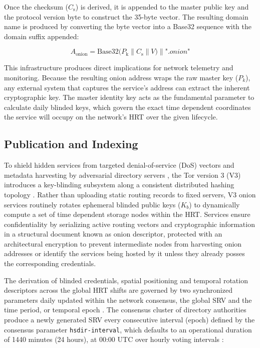 \documentclass[conference]{IEEEtran}
\begin{document}
Once the checksum ($\textit{C}_{\text{s}}$) is derived, it is appended to the master public key and the protocol version byte to construct the 35-byte vector. The resulting domain name is produced by converting the 
byte vector into a Base32 sequence with the domain suffix appended:

\begin{equation}
\textit{A}_{\text{onion}} = \text{Base32}\big(\textit{P}_{\text{k}} \parallel \textit{C}_{\text{s}} \parallel \textit{V}\big) \parallel \textit{".onion"}
\end{equation}

This infrastructure produces direct implications for network telemetry and monitoring. Because the resulting onion address wraps the raw master key ($\textit{P}_{k}$), any external system that captures the service's address
can extract the inherent cryptographic key. The master identity key acts as the fundamental parameter to calculate daily blinded keys, which govern the exact time dependent coordinates the service will occupy on the network's HRT
over the given lifecycle.

\subsection{Publication and Indexing}\label{subsec:pub-n-index}

To shield hidden services from targeted denial-of-service (DoS) vectors and metadata harvesting by adversarial directory servers \cite{biryukov2013trawling}, the Tor version 3 (V3) introduces a key-blinding subsystem along a consistent distributed hashing topology \cite{tor_rendspec}.
Rather than uploading static routing records to fixed servers, V3 onion services routinely rotates ephemeral blinded public keys ($\textit{K}_{b}$) to dynamically compute a set of time dependent storage nodes within the HRT. Services
ensure confidentiality by serializing active routing vectors and cryptographic information in a structural document known as onion descriptor, protected with an architectural encryption to prevent intermediate nodes from harvesting onion addresses
or identify the services being hosted by it unless they already posses the corresponding credentials.

The derivation of blinded credentials, spatial positioning and temporal rotation descriptors across the global HRT shifts are governed by two synchronized parameters daily updated within the network consensus, the global SRV and the time period, or temporal epoch \cite{tor_rendspec}.
The consensus cluster of directory authorities produce a newly generated SRV every consecutive interval (epoch) defined by the consensus parameter \texttt{hsdir-interval}, which defaults to an operational duration of 1440 minutes (24 hours), at 00:00 UTC over hourly voting intervals \cite{tor_srvspec}:
\end{document}
